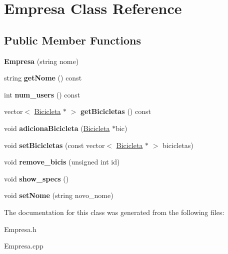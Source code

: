 \hypertarget{class_empresa}{\section{Empresa Class Reference}
\label{class_empresa}
}
\subsection*{Public Member Functions}
\begin{DoxyCompactItemize}
\item 
\hypertarget{class_empresa_ac5bccaf3758b25fea4803a63d4362236}{{\bfseries Empresa} (string nome)}\label{class_empresa_ac5bccaf3758b25fea4803a63d4362236}

\item 
\hypertarget{class_empresa_a22e7cb6769eca729ad9f9d8a0cb0168a}{string {\bfseries get\+Nome} () const }\label{class_empresa_a22e7cb6769eca729ad9f9d8a0cb0168a}

\item 
\hypertarget{class_empresa_a0cd3335f43eb48e7da506a454d95fdb5}{int {\bfseries num\+\_\+users} () const }\label{class_empresa_a0cd3335f43eb48e7da506a454d95fdb5}

\item 
\hypertarget{class_empresa_aa5786b3765e8321ca420b0c5be4bb21c}{vector$<$ \hyperlink{class_bicicleta}{Bicicleta} $\ast$ $>$ {\bfseries get\+Bicicletas} () const }\label{class_empresa_aa5786b3765e8321ca420b0c5be4bb21c}

\item 
\hypertarget{class_empresa_a1b02af861954e1ddfd89c988faa62895}{void {\bfseries adiciona\+Bicicleta} (\hyperlink{class_bicicleta}{Bicicleta} $\ast$bic)}\label{class_empresa_a1b02af861954e1ddfd89c988faa62895}

\item 
\hypertarget{class_empresa_a585cffc1ecf217ea29827fb8e7fd6091}{void {\bfseries set\+Bicicletas} (const vector$<$ \hyperlink{class_bicicleta}{Bicicleta} $\ast$ $>$ bicicletas)}\label{class_empresa_a585cffc1ecf217ea29827fb8e7fd6091}

\item 
\hypertarget{class_empresa_ac09f08cdc3415311fd222cfadbaf6cb4}{void {\bfseries remove\+\_\+bicis} (unsigned int id)}\label{class_empresa_ac09f08cdc3415311fd222cfadbaf6cb4}

\item 
\hypertarget{class_empresa_aa7fb06c4029739ea9e33216942cb4686}{void {\bfseries show\+\_\+specs} ()}\label{class_empresa_aa7fb06c4029739ea9e33216942cb4686}

\item 
\hypertarget{class_empresa_a86f2b94b2ea2e7b11edbf645b4e55bac}{void {\bfseries set\+Nome} (string novo\+\_\+nome)}\label{class_empresa_a86f2b94b2ea2e7b11edbf645b4e55bac}

\end{DoxyCompactItemize}


The documentation for this class was generated from the following files\+:\begin{DoxyCompactItemize}
\item 
Empresa.\+h\item 
Empresa.\+cpp\end{DoxyCompactItemize}
